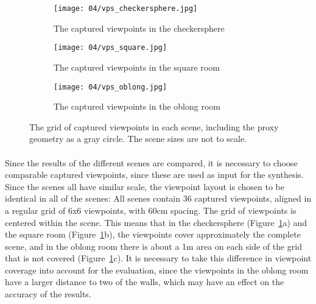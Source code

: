 \begin{figure}
\centering
    \hfill
    \begin{subfigure}[b]{0.4\textwidth}
            \centering
            \texttt{[image: 04/vps\_checkersphere.jpg]}
            \caption{The captured viewpoints in the checkersphere}
    \end{subfigure}
    \hfill
    \begin{subfigure}[b]{0.4\textwidth}
            \centering
            \texttt{[image: 04/vps\_square.jpg]}
            \caption{The captured viewpoints in the square room}
    \end{subfigure}
    \hfill
    \hfill

    \hfill
    \begin{subfigure}[b]{0.4\textwidth}
            \centering
            \texttt{[image: 04/vps\_oblong.jpg]}
            \caption{The captured viewpoints in the oblong room}
    \end{subfigure}
    \hfill
    \hfill
  \caption[The grid of captured viewpoints in each scene, including the proxy geometry]{The grid of captured viewpoints in each scene, including the proxy geometry as a gray circle. The scene sizes are not to scale.} \label{fig:vps_grid}
\end{figure}

\paragraph{}
Since the results of the different scenes are compared, it is necessary to choose comparable captured viewpoints, since these are used as input for the synthesis. Since the scenes all have similar scale, the viewpoint layout is chosen to be identical in all of the scenes: All scenes contain 36 captured viewpoints, aligned in a regular grid of 6x6 viewpoints, with 60cm spacing. The grid of viewpoints is centered within the scene. This means that in the checkersphere (Figure~\ref{fig:vps_grid}a) and the square room (Figure~\ref{fig:vps_grid}b), the viewpoints cover approximately the complete scene, and in the oblong room there is about a 1m area on each side of the grid that is not covered (Figure~\ref{fig:vps_grid}c). It is necessary to take this difference in viewpoint coverage into account for the evaluation, since the viewpoints in the oblong room have a larger distance to two of the walls, which may have an effect on the accuracy of the results.

